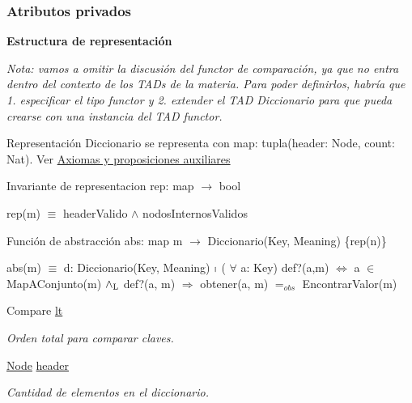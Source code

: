 \subsubsection*{\-Atributos privados}
\begin{Indent}{\bf \-Estructura de representación}\par
{\em \-Nota\-: vamos a omitir la discusión del functor de comparación, ya que no entra dentro del contexto de los \-T\-A\-Ds de la materia. \-Para poder definirlos, habría que 1. especificar el tipo functor y 2. extender el \-T\-A\-D \-Diccionario para que pueda crearse con una instancia del \-T\-A\-D functor.

\begin{DoxyParagraph}{\-Representación}
\-Diccionario se representa con map\-: tupla(header\-: Node, count\-: Nat). \-Ver \hyperlink{axiomas}{\-Axiomas y proposiciones auxiliares}
\end{DoxyParagraph}
\begin{DoxyParagraph}{\-Invariante de representacion}
rep\-: map $\to$ bool\par
 rep(m) $\equiv$ header\-Valido $\land$ nodos\-Internos\-Validos 
\end{DoxyParagraph}
\begin{DoxyParagraph}{\-Función de abstracción}
abs\-: map m $\to$ \-Diccionario(\-Key, \-Meaning) \{rep(n)\}\par
 abs(m) $\equiv$ d\-: \-Diccionario(\-Key, \-Meaning) $\shortmid$ ( $\forall$ a\-: \-Key) def?(a,m) $\Leftrightarrow$ a $\in$ \-Map\-A\-Conjunto(m) $\land_{\rm L}$ def?(a, m) $\Rightarrow$ obtener(a, m) $=_{obs}$ \-Encontrar\-Valor(m)  
\end{DoxyParagraph}
}\begin{DoxyCompactItemize}
\item 
\-Compare \hyperlink{classaed2_1_1map_a0e5be36fae0693e4665bd2a615e7550a_a0e5be36fae0693e4665bd2a615e7550a}{lt}
\begin{DoxyCompactList}\small\item\em \-Orden total para comparar claves. \end{DoxyCompactList}\item 
\hyperlink{structaed2_1_1map_1_1Node}{\-Node} \hyperlink{classaed2_1_1map_a92d93f905c8ad73fba18fdc7e8915cce_a92d93f905c8ad73fba18fdc7e8915cce}{header}
\begin{DoxyCompactList}\small\item\em \-Cantidad de elementos en el diccionario. \end{DoxyCompactList}\end{DoxyCompactItemize}
\end{Indent}
